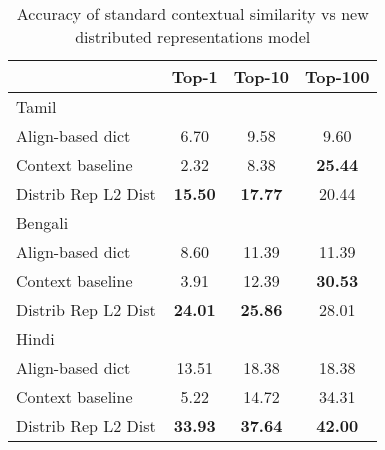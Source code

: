 \documentclass[11pt]{article}
\begin{document}
\begin{table}
\begin{center}
\begin{tabular}{|l|c|c|c|}
\hline
& Top-1 & Top-10 & Top-100 \\
\hline
\multicolumn{4}{|l|}{Tamil}  \\
\hline
Align-based dict & 6.70 & 9.58 & 9.60 \\
Context baseline & 2.32 & 8.38 & {\bf 25.44} \\ 
Distrib Rep L2 Dist & {\bf 15.50} & {\bf 17.77} & 20.44 \\
\hline
\multicolumn{4}{|l|}{Bengali}  \\
\hline
Align-based dict & 8.60 & 11.39 & 11.39 \\
Context baseline & 3.91 & 12.39 & {\bf 30.53} \\
Distrib Rep L2 Dist & {\bf 24.01} & {\bf 25.86} & 28.01 \\
\hline
\multicolumn{4}{|l|}{Hindi}  \\
\hline
Align-based dict & 13.51 & 18.38 & 18.38 \\
Context baseline & 5.22 & 14.72 & 34.31 \\
Distrib Rep L2 Dist & {\bf 33.93} & {\bf 37.64} & {\bf 42.00} \\
\hline
\end{tabular}
\end{center}
\caption{Accuracy of standard contextual similarity vs new distributed representations model}\label{accresults}
\vspace{-.35cm}
\end{table}

\end{document}

